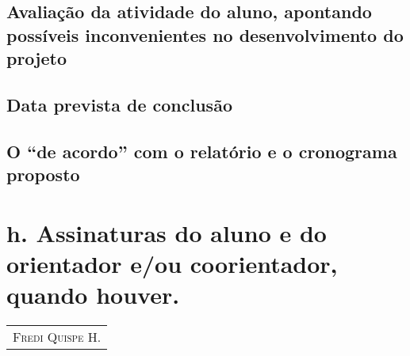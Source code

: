 \documentclass[a4paper, 11pt]{article}
\begin{document}
\subsection{Avaliação   da   atividade   do   aluno,   apontando   possíveis   inconvenientes   no desenvolvimento do projeto}
\subsection{Data prevista de conclusão}
\subsection{O “de acordo” com o relatório e o cronograma proposto}

\section*{h. Assinaturas do aluno e do orientador e/ou coorientador, quando houver.}

\newpage

 
\vfill \hfill
\begin{tabular}{c}

\\ \hline
\textsc{Fredi Quispe H.}
\end{tabular}
\end{document}
